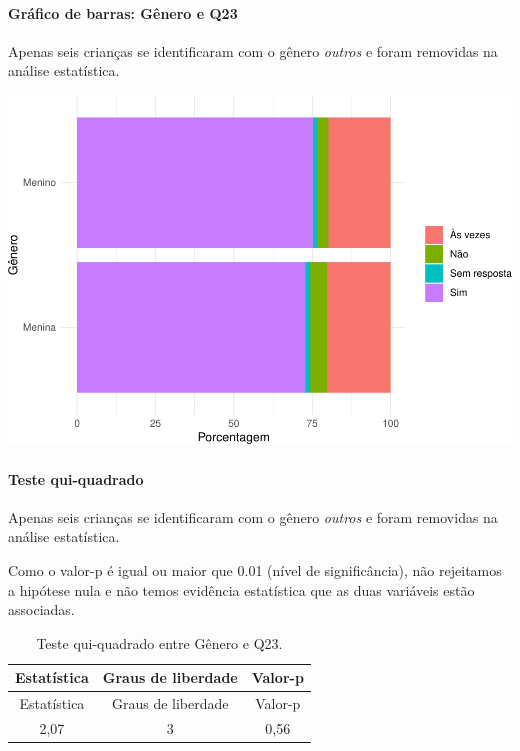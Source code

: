 \documentclass[]{article}
\let\oldparagraph\paragraph
\renewcommand{\paragraph}[1]{\oldparagraph{#1}\mbox{}}
\begin{document}
\hypertarget{gruxe1fico-de-barras-guxeanero-e-q23}{%
\paragraph{Gráfico de barras: Gênero e Q23}\label{gruxe1fico-de-barras-guxeanero-e-q23}}

Apenas seis crianças se identificaram com o gênero \emph{outros} e foram removidas na análise estatística.

\begin{center}\includegraphics[width=0.75\linewidth]{relatorio_covid19_files/figure-latex/unnamed-chunk-555-1} \end{center}

\hypertarget{teste-qui-quadrado-48}{%
\paragraph{Teste qui-quadrado}\label{teste-qui-quadrado-48}}

Apenas seis crianças se identificaram com o gênero \emph{outros} e foram removidas na análise estatística.

Como o valor-p é igual ou maior que 0.01 (nível de significância), não rejeitamos a hipótese nula e não temos evidência estatística que as duas variáveis estão associadas.

\begin{longtable}[]{@{}ccc@{}}
\caption{\label{tab:unnamed-chunk-557}Teste qui-quadrado entre Gênero e Q23.}\tabularnewline
\toprule
Estatística & Graus de liberdade & Valor-p\tabularnewline
\midrule
\endfirsthead
\toprule
Estatística & Graus de liberdade & Valor-p\tabularnewline
\midrule
\endhead
2,07 & 3 & 0,56\tabularnewline
\bottomrule
\end{longtable}

\cleardoublepage
\end{document}
